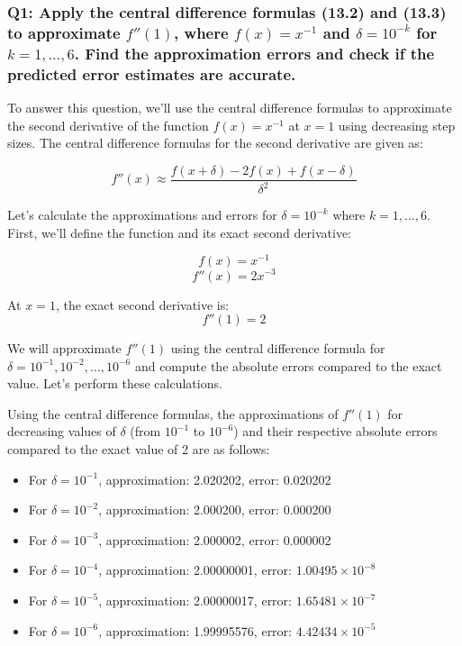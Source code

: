 \documentclass[8pt]{article}
\begin{document}
\subsubsection*{Q1: Apply the central difference formulas (13.2) and (13.3) to approximate \( f''(1) \), where \( f(x) = x^{-1} \) and \(\delta = 10^{-k}\) for \( k = 1, \ldots, 6 \). Find the approximation errors and check if the predicted error estimates are accurate.}

To answer this question, we'll use the central difference formulas to approximate the second derivative of the function \( f(x) = x^{-1} \) at \( x = 1 \) using decreasing step sizes. The central difference formulas for the second derivative are given as:

\[ f''(x) \approx \frac{f(x+\delta) - 2f(x) + f(x-\delta)}{\delta^2} \]

Let's calculate the approximations and errors for \( \delta = 10^{-k} \) where \( k = 1, \ldots, 6 \). First, we'll define the function and its exact second derivative:

\[ f(x) = x^{-1} \]
\[ f''(x) = 2x^{-3} \]

At \( x = 1 \), the exact second derivative is:
\[ f''(1) = 2 \]

We will approximate \( f''(1) \) using the central difference formula for \( \delta = 10^{-1}, 10^{-2}, \ldots, 10^{-6} \) and compute the absolute errors compared to the exact value. Let's perform these calculations.

Using the central difference formulas, the approximations of \( f''(1) \) for decreasing values of \( \delta \) (from \( 10^{-1} \) to \( 10^{-6} \)) and their respective absolute errors compared to the exact value of 2 are as follows:

\begin{itemize}
    \item For \( \delta = 10^{-1} \), approximation: 2.020202, error: 0.020202
    \item For \( \delta = 10^{-2} \), approximation: 2.000200, error: 0.000200
    \item For \( \delta = 10^{-3} \), approximation: 2.000002, error: 0.000002
    \item For \( \delta = 10^{-4} \), approximation: 2.00000001, error: \( 1.00495 \times 10^{-8} \)
    \item For \( \delta = 10^{-5} \), approximation: 2.00000017, error: \( 1.65481 \times 10^{-7} \)
    \item For \( \delta = 10^{-6} \), approximation: 1.99995576, error: \( 4.42434 \times 10^{-5} \)
\end{itemize}
\end{document}
